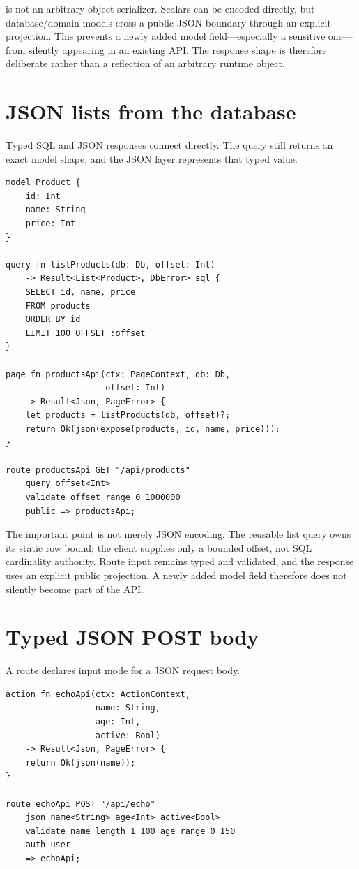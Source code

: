  is not an arbitrary object serializer. Scalars can be encoded directly, but database/domain models cross a public JSON boundary through an explicit  projection. This prevents a newly added model field---especially a sensitive one---from silently appearing in an existing API. The response shape is therefore deliberate rather than a reflection of an arbitrary runtime object.

\section{JSON lists from the database}

Typed SQL and JSON responses connect directly. The query still returns an exact model shape, and the JSON layer represents that typed value.

\begin{lstlisting}[language=RWLang]
model Product {
    id: Int
    name: String
    price: Int
}

query fn listProducts(db: Db, offset: Int)
    -> Result<List<Product>, DbError> sql {
    SELECT id, name, price
    FROM products
    ORDER BY id
    LIMIT 100 OFFSET :offset
}

page fn productsApi(ctx: PageContext, db: Db,
                    offset: Int)
    -> Result<Json, PageError> {
    let products = listProducts(db, offset)?;
    return Ok(json(expose(products, id, name, price)));
}

route productsApi GET "/api/products"
    query offset<Int>
    validate offset range 0 1000000
    public => productsApi;
\end{lstlisting}

The important point is not merely JSON encoding. The reusable list query owns its static row bound; the client supplies only a bounded offset, not SQL cardinality authority. Route input remains typed and validated, and the response uses an explicit public projection. A newly added model field therefore does not silently become part of the API.

\section{Typed JSON POST body}

A route declares  input mode for a JSON request body.

\begin{lstlisting}[language=RWLang]
action fn echoApi(ctx: ActionContext,
                  name: String,
                  age: Int,
                  active: Bool)
    -> Result<Json, PageError> {
    return Ok(json(name));
}

route echoApi POST "/api/echo"
    json name<String> age<Int> active<Bool>
    validate name length 1 100 age range 0 150
    auth user
    => echoApi;
\end{lstlisting}

